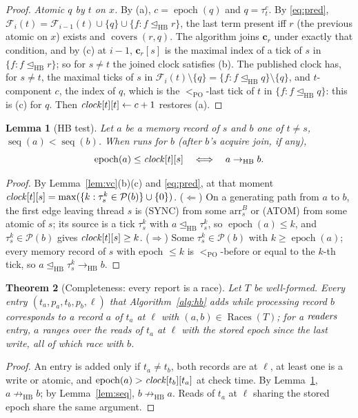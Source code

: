 \documentclass[11pt]{article}
\newtheorem{theorem}{Theorem}
\newtheorem{lemma}[theorem]{Lemma}
\theoremstyle{remark}
\DeclareMathOperator{\seq}{seq}
\DeclareMathOperator{\epoch}{epoch}
\DeclareMathOperator{\Races}{Races}
\DeclareMathOperator{\covers}{covers}
\newcommand{\HB}{\to_{\mathrm{HB}}}
\newcommand{\HBr}{\trianglelefteq_{\mathrm{HB}}}
\newcommand{\PO}{<_{\mathrm{PO}}}
\newcommand{\arr}[2]{\mathrm{arr}^{#2}_{#1}}
\newcommand{\tick}[2]{\tau^{#2}_{#1}}
\newcommand{\Fr}{\mathcal{F}}
\begin{document}
\begin{proof}
\emph{Atomic $q$ by $t$ on $x$.} By (a), $c=\epoch(q)$ and $q=\tick{t}{c}$.
By \eqref{eq:pred}, $\Fr_i(t)=\Fr_{i-1}(t)\cup\{q\}\cup\{f:f\HBr r\}$, the
last term present iff $r$ (the previous atomic on $x$) exists and
$\covers(r,q)$. The algorithm joins $\mathbf{c}_r$ under exactly that
condition, and by (c) at $i-1$, $\mathbf{c}_r[s]$ is the maximal index of a
tick of $s$ in $\{f:f\HBr r\}$; so for $s\ne t$ the joined clock satisfies
(b). The published clock has, for $s\ne t$, the maximal ticks of $s$ in
$\Fr_i(t)\setminus\{q\}=\{f:f\HBr q\}\setminus\{q\}$, and $t$-component $c$,
the index of $q$, which is the $\PO$-last tick of $t$ in $\{f:f\HBr q\}$: this
is (c) for $q$. Then $\mathit{clock}[t][t]\gets c+1$ restores (a).
\end{proof}

\begin{lemma}[HB test]\label{lem:test}
Let $a$ be a memory record of $s$ and $b$ one of $t\ne s$, $\seq(a)<\seq(b)$.
When \Check{} runs for $b$ (after $b$'s acquire join, if any),
\[
\epoch(a)\le\clk[t][s]\quad\Longleftrightarrow\quad a\HB b .
\]
\end{lemma}
\begin{proof}
By Lemma~\ref{lem:vc}(b)(c) and \eqref{eq:pred}, at that moment
$\clk[t][s]=\max(\{k:\tick{s}{k}\in\mathcal{P}(b)\}\cup\{0\})$.
($\Leftarrow$) On a generating path from $a$ to $b$, the first edge leaving
thread $s$ is (SYNC) from some $\arr{s}{B}$ or (ATOM) from some atomic of
$s$; its source is a tick $\tick{s}{k}$ with $a\HBr\tick{s}{k}$, so
$\epoch(a)\le k$, and $\tick{s}{k}\in\mathcal{P}(b)$ gives
$\mathit{clock}[t][s]\ge k$. ($\Rightarrow$) Some $\tick{s}{k}\in\mathcal{P}(b)$
with $k\ge\epoch(a)$; every memory record of $s$ with epoch $\le k$ is
$\PO$-before or equal to the $k$-th tick, so $a\HBr\tick{s}{k}\HB b$.
\end{proof}

\begin{theorem}[Completeness: every report is a race]\label{thm:complete}
Let $T$ be well-formed. Every entry $(t_a,p_a,t_b,p_b,\ell)$ that
Algorithm~\ref{alg:hb} adds while processing record $b$ corresponds to a
record $a$ of $t_a$ at $\ell$ with $(a,b)\in\Races(T)$; for a
$\mathit{readers}$ entry, $a$ ranges over the reads of $t_a$ at $\ell$ with the stored
epoch since the last write, all of which race with $b$.
\end{theorem}
\begin{proof}
An entry is added only if $t_a\ne t_b$, both records are at $\ell$, at least
one is a write or atomic, and $\epoch(a)>\clk[t_b][t_a]$ at check
time. By Lemma~\ref{lem:test}, $a\not\HB b$; by Lemma~\ref{lem:seq},
$b\not\HB a$. Reads of $t_a$ at $\ell$ sharing the stored epoch share the
same argument.
\end{proof}
\end{document}
